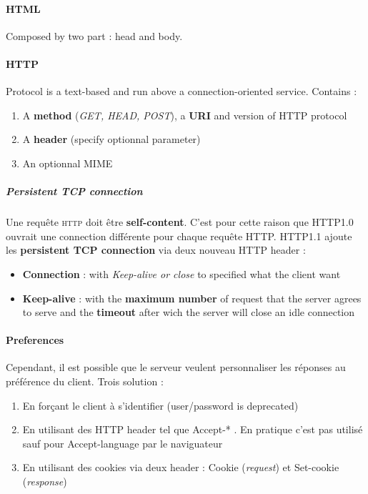 \paragraph{\textbf{HTML}} 
Composed by two part : head and body.

\paragraph{\textbf{HTTP}}
Protocol is a text-based and run above a connection-oriented service. Contains :
\begin{enumerate}
    \item A \textbf{method} (\textit{GET, HEAD, POST}), a \textbf{URI} and version of HTTP protocol
    \item A \textbf{header} (specify optionnal parameter)
    \item An optionnal MIME
\end{enumerate}

\subparagraph{Persistent TCP connection}
Une requête \textsc{http} doit être \textbf{self-content}. C'est pour cette
raison que HTTP1.0 ouvrait une connection différente pour chaque requête HTTP.
HTTP1.1 ajoute les \textbf{persistent TCP connection} via
deux nouveau HTTP header :
\begin{itemize}
    \item \textbf{Connection} : with \textit{Keep-alive or close} to specified what 
        the client want
    \item \textbf{Keep-alive} : with the \textbf{maximum number} of request that the server
        agrees to serve and the \textbf{timeout} after wich the server will close an idle connection
\end{itemize}

\paragraph{Preferences}
Cependant, il est possible que le serveur veulent personnaliser les réponses au préférence du client. Trois solution :

\begin{enumerate}
    \item En forçant le client à s'identifier (user/password is deprecated)
    \item En utilisant des HTTP header tel que Accept-* . En pratique c'est pas utilisé
        sauf pour Accept-language par le naviguateur
    \item En utilisant des cookies via deux header : Cookie (\textit{request}) et 
        Set-cookie (\textit{response})
\end{enumerate}

